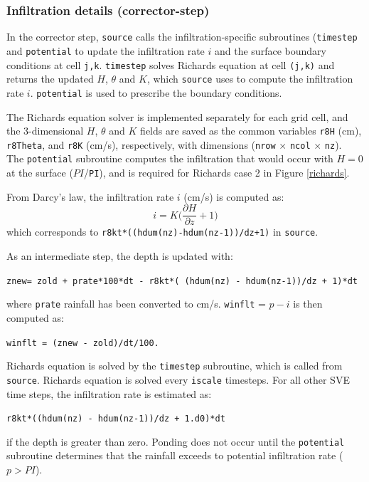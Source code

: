 \documentclass{article}
\newcommand{\code}[1]{\texttt{#1}}
\begin{document}
\subsubsection*{Infiltration details (corrector-step)}

In the corrector step, \code{source} calls the infiltration-specific subroutines (\code{timestep} and \code{potential} to update the infiltration rate $i$ and the surface boundary conditions at cell \code{j,k}. 
\code{timestep} solves Richards equation at cell \code{(j,k)} and returns the updated $H$, $\theta$ and $K$, which \code{source} uses to compute the infiltration rate $i$. \code{potential} is used to prescribe the boundary conditions. 

 The Richards equation solver is implemented separately for each grid cell, and the 3-dimensional $H$, $\theta$ and $K$  fields are saved as the common variables \code{r8H} (cm), \code{r8Theta}, and  \code{r8K} (cm/s), respectively, with dimensions (\code{nrow} $\times$ \code{ncol} $\times$ \code{nz}).\\ 

The \code{potential} subroutine computes the infiltration that would occur with $H=0$ at the surface ($PI$/\code{PI}), and is required for Richards case 2 in Figure \ref{richards}.

\noindent From Darcy's law, the infiltration rate $i$ (cm/s) is computed as:
$$ i =  K \bigg(\frac{\partial H}{\partial z} + 1\bigg ) $$
which corresponds to \code{r8kt*((hdum(nz)-hdum(nz-1))/dz+1)} in \code{source}.

\noindent  As an intermediate step, the depth is updated with: \\
\begin{center}
\code{znew=  zold + prate*100*dt - r8kt*( (hdum(nz) - hdum(nz-1))/dz + 1)*dt } 	
\end{center}
where \code{prate}  rainfall has been converted to cm/s.
 \code{winflt} = $p-i$  is then computed as:
\begin{center}
 \code{winflt = (znew - zold)/dt/100.} 	
\end{center}

	
 

Richards equation is solved by the \code{timestep} subroutine, which is called from \code{source}.
 Richards equation is solved every \code{iscale} timesteps. 
  For all other SVE time steps, the infiltration rate is estimated as:
		  \begin{center}
			\code{r8kt*((hdum(nz) - hdum(nz-1))/dz + 1.d0)*dt} 		  	
		  \end{center}
		if the depth is greater than zero.    Ponding does not occur until the \code{potential} subroutine determines that the rainfall exceeds to potential infiltration rate ($p>PI$). 		
		
\end{document}
